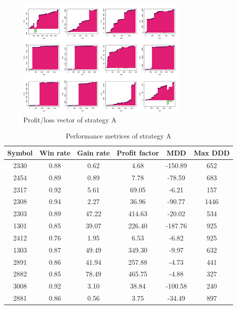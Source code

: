 \documentclass[12pt, letterpaper, oneside]{article}
\begin{document}
\begin{figure}[h]
    \centering
    \includegraphics[width=0.75\textwidth]{sa_pl}
    \caption{Profit/loss vector of strategy A}
    \label{fig:a}
\end{figure}

\begin{table}[h!]
    \centering
    \begin{tabular}{ |c|c|c|c|c|c| }
        \hline
        Symbol & Win rate & Gain rate & Profit factor & MDD & Max DDD \\ [0.5ex]
        \hline
        2330 & 0.88 & 0.62 & 4.68 & -150.89 & 652 \\
        2454 & 0.89 & 0.89 & 7.78 & -78.59 & 683 \\
        2317 & 0.92 & 5.61 & 69.05 & -6.21 & 157 \\
        2308 & 0.94 & 2.27 & 36.96 & -90.77 & 1446 \\
        2303 & 0.89 & 47.22 & 414.63 & -20.02 & 534 \\
        1301 & 0.85 & 39.07 & 226.40 & -187.76 & 925 \\
        2412 & 0.76 & 1.95 & 6.53 & -6.82 & 925 \\
        1303 & 0.87 & 49.49 & 349.30 & -9.97 & 632 \\
        2891 & 0.86 & 41.94 & 257.88 & -4.73 & 441 \\
        2882 & 0.85 & 78.49 & 465.75 & -4.88 & 327 \\
        3008 & 0.92 & 3.10 & 38.84 & -100.58 & 240 \\
        2881 & 0.86 & 0.56 & 3.75 & -34.49 & 897 \\ [0.5ex]
        \hline
    \end{tabular}
    \caption{Performance metrices of strategy A}
    \label{table:a}
\end{table}
\end{document}
